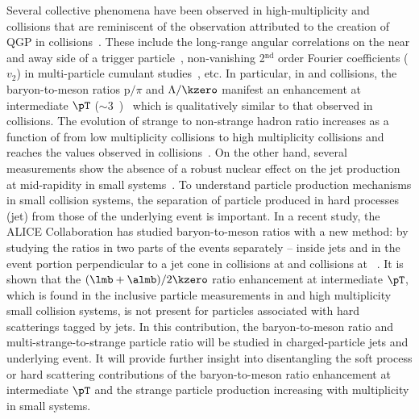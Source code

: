\documentclass[ALICE,manyauthors]{cernphprep}
\begin{document}
Several collective phenomena have been observed in high-multiplicity \pp and \pPb collisions that are reminiscent of the observation attributed to the creation of QGP in \PbPb collisions~\cite{Aad:2015gqa, Abelev:2012ola, ABELEV:2013wsa, Khachatryan:2015waa, Acharya:2019vdf, Abelev:2014uua, Adam:2015vsf}.
These include the long-range angular correlations on the near and away side of a trigger particle~\cite{Aad:2015gqa, Abelev:2012ola, ABELEV:2013wsa}, non-vanishing 2$^\mathrm{nd}$ order Fourier coefficients ($v_{2}$) in multi-particle cumulant studies~\cite{Acharya:2019vdf, Khachatryan:2015waa}, etc.
In particular, in \pp and \pPb collisions, the baryon-to-meson ratios p$/\pi$ and $\Lambda/\kzero$ manifest an enhancement at intermediate $\pT$ ($\sim 3$~\GeVc)~\cite{Acharya:2018orn, Khachatryan:2016yru, Abelev:2013xaa, ALICE:2017jyt} which is qualitatively similar to that observed in \PbPb collisions.
The evolution of strange to non-strange hadron ratio increases as a function of \dndeta from low multiplicity \pp collisions to high multiplicity \pPb collisions and reaches the values observed in \PbPb collisions~\cite{Abelev:2013haa, ALICE:2017jyt, Khachatryan:2016yru}.
On the other hand, several measurements show the absence of a robust nuclear effect on the jet production at mid-rapidity in small systems~\cite{ALICE:2017svf, Acharya:2019jyg, Acharya:2019tku, ALICE:2014dla, Abelev:2013fn, Acharya:2018eat, Acharya:2017okq, Adam:2015xea, Adam:2016jfp}.
To understand particle production mechanisms in small collision systems, the separation of particle produced in hard processes (jet) from those of the underlying event is important.
In a recent study, the ALICE Collaboration has studied baryon-to-meson ratios with a new method: by studying the ratios in two parts of the events separately -- inside jets and in the event portion perpendicular to a jet cone in \pp collisions at \seven and \pPb collisions at \fivenn~\cite{Acharya:2021oaa}. 
It is shown that the $(\lmb + \almb)/2\kzero$ ratio enhancement at intermediate $\pT$, which is found in the inclusive particle measurements in \PbPb and high multiplicity small collision systems, is not present for particles associated with hard scatterings tagged by jets.
In this contribution, the baryon-to-meson ratio and multi-strange-to-strange particle ratio will be studied in charged-particle jets and underlying event.
It will provide further insight into disentangling the soft process or hard scattering contributions of the baryon-to-meson ratio enhancement at intermediate $\pT$ and the strange particle production increasing with multiplicity in small systems.
\end{document}
